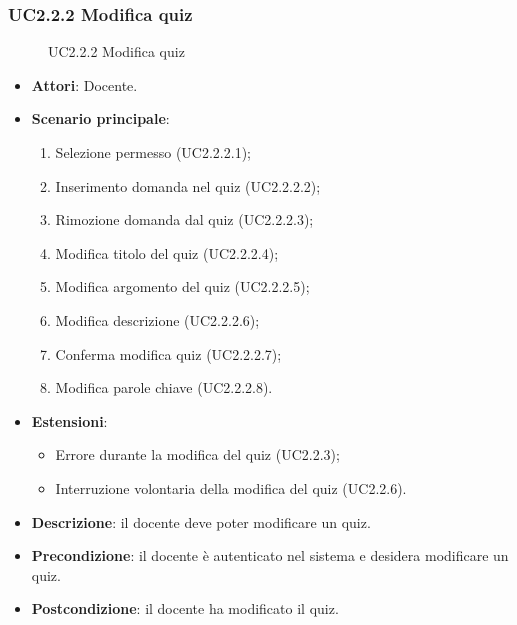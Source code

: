 \subsubsection{UC2.2.2 Modifica quiz}
\begin{figure}[H]
\centering
\noindent{}
\caption{UC2.2.2 Modifica quiz}
\end{figure}
\begin{itemize}
\item \textbf{Attori}: Docente.
\item \textbf{Scenario principale}:
\begin{enumerate}
\item Selezione permesso (UC2.2.2.1);
\item Inserimento domanda nel quiz (UC2.2.2.2);
\item Rimozione domanda dal quiz (UC2.2.2.3);
\item Modifica titolo del quiz (UC2.2.2.4);
\item Modifica argomento del quiz (UC2.2.2.5);
\item Modifica descrizione (UC2.2.2.6);
\item Conferma modifica quiz (UC2.2.2.7);
\item Modifica parole chiave (UC2.2.2.8).
\end{enumerate}
\item \textbf{Estensioni}:
\begin{itemize}
\item Errore durante la modifica del quiz (UC2.2.3);
\item Interruzione volontaria della modifica del quiz (UC2.2.6).
\end{itemize}
\item \textbf{Descrizione}: il docente deve poter modificare un quiz.
\item \textbf{Precondizione}: il docente è autenticato nel sistema e desidera modificare un quiz.
\item \textbf{Postcondizione}: il docente ha modificato il quiz.
\end{itemize}

